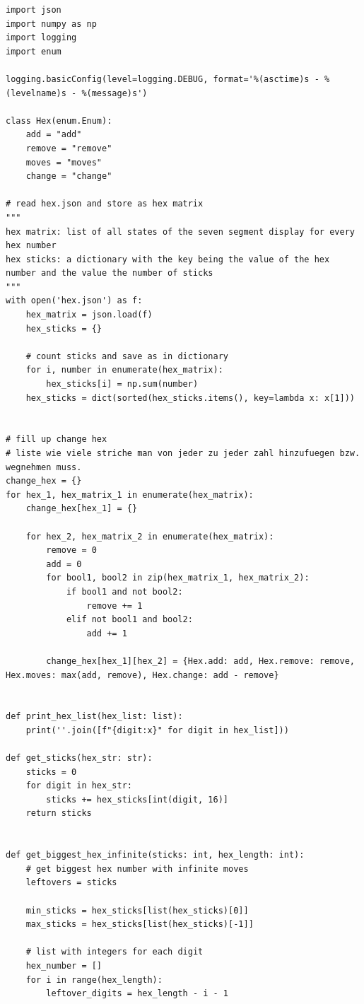 \documentclass[a4paper,10pt,ngerman]{scrartcl}
\begin{document}
\lstset{
	language=python, 				%
}
\begin{lstlisting}
import json
import numpy as np
import logging
import enum

logging.basicConfig(level=logging.DEBUG, format='%(asctime)s - %(levelname)s - %(message)s')

class Hex(enum.Enum):
    add = "add"
    remove = "remove"
    moves = "moves"
    change = "change"

# read hex.json and store as hex matrix
"""
hex matrix: list of all states of the seven segment display for every hex number
hex sticks: a dictionary with the key being the value of the hex number and the value the number of sticks
"""
with open('hex.json') as f:
    hex_matrix = json.load(f)
    hex_sticks = {}

    # count sticks and save as in dictionary
    for i, number in enumerate(hex_matrix):
        hex_sticks[i] = np.sum(number)
    hex_sticks = dict(sorted(hex_sticks.items(), key=lambda x: x[1]))


# fill up change hex
# liste wie viele striche man von jeder zu jeder zahl hinzufuegen bzw. wegnehmen muss.
change_hex = {}
for hex_1, hex_matrix_1 in enumerate(hex_matrix):
    change_hex[hex_1] = {}

    for hex_2, hex_matrix_2 in enumerate(hex_matrix):
        remove = 0
        add = 0
        for bool1, bool2 in zip(hex_matrix_1, hex_matrix_2):
            if bool1 and not bool2:
                remove += 1
            elif not bool1 and bool2:
                add += 1

        change_hex[hex_1][hex_2] = {Hex.add: add, Hex.remove: remove, Hex.moves: max(add, remove), Hex.change: add - remove}


def print_hex_list(hex_list: list):
    print(''.join([f"{digit:x}" for digit in hex_list]))

def get_sticks(hex_str: str):
    sticks = 0
    for digit in hex_str:
        sticks += hex_sticks[int(digit, 16)]
    return sticks


def get_biggest_hex_infinite(sticks: int, hex_length: int):
    # get biggest hex number with infinite moves
    leftovers = sticks

    min_sticks = hex_sticks[list(hex_sticks)[0]]
    max_sticks = hex_sticks[list(hex_sticks)[-1]]

    # list with integers for each digit
    hex_number = []
    for i in range(hex_length):
        leftover_digits = hex_length - i - 1


\end{lstlisting}
\end{document}
